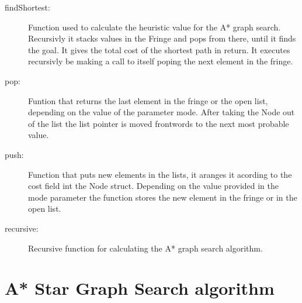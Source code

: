 \begin{description}
\item[findShortest:]Function used to calculate the heuristic value for the A* graph search. Recursivly it stacks values in the Fringe 
and pops from there, until it finds the goal. It gives the total cost of the shortest path in return. It executes recursivly be making a call 
to itself poping the next element in the fringe.
\item[pop:]Funtion that returns the last element in the fringe or the open list, depending on the value of the parameter mode. After 
taking the Node out of the list the list pointer is moved frontwords to the next most probable value.
\item[push:]Function that puts new elements in the lists, it aranges it acording to the cost field int the Node struct. Depending on the 
value provided in the mode parameter the function stores the new element in the fringe or in the open list.
\item[recursive:]Recursive function for calculating the A* graph search algorithm.
\end{description}


\section{A* Star Graph Search algorithm}


